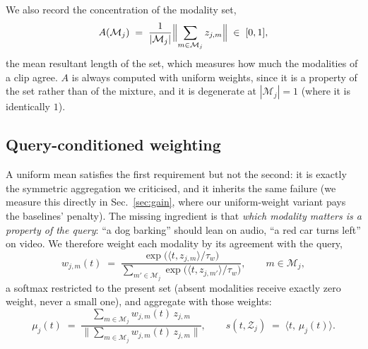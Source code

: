 We also record the concentration of the modality set,
\begin{equation}
  A(\mathcal{M}_j) \;=\; \frac{1}{|\mathcal{M}_j|}
    \Bigl\| \sum_{m \in \mathcal{M}_j} z_{j,m} \Bigr\| \;\in\; [0, 1],
  \label{eq:resultant}
\end{equation}
the mean resultant length of the set, which measures how much the modalities of a
clip agree. $A$ is always computed with uniform weights, since it is a property of
the set rather than of the mixture, and it is degenerate at $|\mathcal{M}_j| = 1$
(where it is identically $1$).

\subsection{Query-conditioned weighting}
\label{sec:qw}

A uniform mean satisfies the first requirement but not the second: it is exactly the
symmetric aggregation we criticised, and it inherits the same failure (we measure
this directly in Sec.~\ref{sec:gain}, where our uniform-weight variant pays the
baselines' penalty). The missing ingredient is that \emph{which modality matters is a
property of the query}: ``a dog barking'' should lean on audio, ``a red car turns
left'' on video. We therefore weight each modality by its agreement with the query,
\begin{equation}
  w_{j,m}(t) \;=\;
  \frac{\exp\bigl(\langle t, z_{j,m}\rangle / \tau_w\bigr)}
       {\sum_{m' \in \mathcal{M}_j} \exp\bigl(\langle t, z_{j,m'}\rangle / \tau_w\bigr)},
  \qquad m \in \mathcal{M}_j,
  \label{eq:qweights}
\end{equation}
a softmax restricted to the present set (absent modalities receive exactly zero
weight, never a small one), and aggregate with those weights:
\begin{equation}
  \mu_j(t) \;=\; \frac{\displaystyle\sum_{m \in \mathcal{M}_j} w_{j,m}(t)\, z_{j,m}}
                      {\bigl\| \sum_{m \in \mathcal{M}_j} w_{j,m}(t)\, z_{j,m} \bigr\|},
  \qquad
  s(t, \mathcal{Z}_j) \;=\; \bigl\langle t,\, \mu_j(t) \bigr\rangle .
  \label{eq:qcentroid}
\end{equation}

